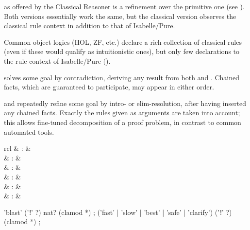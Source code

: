 \begin{isabellebody}
\begin{isamarkuptext}
  \begin{descr}

  \item [\mbox{\isa{rule}}] as offered by the Classical Reasoner is a
  refinement over the primitive one (see ).
  Both versions essentially work the same, but the classical version
  observes the classical rule context in addition to that of
  Isabelle/Pure.

  Common object logics (HOL, ZF, etc.) declare a rich collection of
  classical rules (even if these would qualify as intuitionistic
  ones), but only few declarations to the rule context of
  Isabelle/Pure ().

  \item [\mbox{\isa{contradiction}}] solves some goal by contradiction,
  deriving any result from both  and .  Chained
  facts, which are guaranteed to participate, may appear in either
  order.

  \item [\mbox{\isa{intro}} and \mbox{\isa{elim}}] repeatedly refine
  some goal by intro- or elim-resolution, after having inserted any
  chained facts.  Exactly the rules given as arguments are taken into
  account; this allows fine-tuned decomposition of a proof problem, in
  contrast to common automated tools.

  \end{descr}%
\end{isamarkuptext}%
\isamarkuptrue%
%
\isamarkuptrue%
%
\begin{isamarkuptext}%
\begin{matharray}{rcl}
    \mbox{} & : & \isarmeth \\
    \mbox{} & : & \isarmeth \\
    \mbox{} & : & \isarmeth \\
    \mbox{} & : & \isarmeth \\
    \mbox{} & : & \isarmeth \\
    \mbox{} & : & \isarmeth \\
  \end{matharray}

  \begin{rail}
    'blast' ('!' ?) nat? (clamod *)
    ;
    ('fast' | 'slow' | 'best' | 'safe' | 'clarify') ('!' ?) (clamod *)
    ;


\end{rail}
\end{isamarkuptext}
\end{isabellebody}
